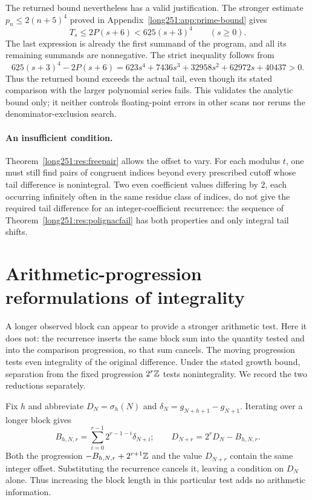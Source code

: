 \documentclass[11pt]{article}
\begin{document}
The returned bound nevertheless has a valid justification.  The stronger
estimate $p_n\le2(n+5)^4$ proved in
Appendix~\ref{long251:app:prime-bound} gives
\[
 T_s\le2P(s+6)<625(s+3)^4\qquad(s\ge0).
\]
The last expression is already the first summand of the program, and
all its remaining summands are nonnegative.  The strict inequality
follows from
\[
 625(s+3)^4-2P(s+6)
 =623s^4+7436s^3+32958s^2+62972s+40437>0.
\]
Thus the returned bound exceeds the actual tail, even though its stated
comparison with the larger polynomial series fails.  This validates the
analytic bound only; it neither controls floating-point errors in other
scans nor reruns the denominator-exclusion search.

\paragraph{An insufficient condition.}  Theorem~\ref{long251:res:freepair} allows the offset to vary.  For each
modulus $t$, one must still find pairs of congruent indices beyond every
prescribed cutoff whose tail difference is nonintegral.
Two even coefficient values differing by $2$, each occurring infinitely
often in the same residue class of indices, do not give the required
tail difference for an integer-coefficient recurrence: the sequence of
Theorem~\ref{long251:res:polignacfail} has both properties and only
integral tail shifts.

\section{Arithmetic-progression reformulations of integrality}
\label{long251:app:affine-detail}
A longer observed block can appear to provide a stronger arithmetic test.
Here it does not: the recurrence inserts the same block sum into the
quantity tested and into the comparison progression, so that sum cancels.
The moving progression tests even integrality of the original difference.
Under the stated growth bound, separation from the fixed progression
$2^r\mathbb{Z}$ tests nonintegrality.  We record the two reductions separately.

Fix $h$ and abbreviate $D_N=\sigma_h(N)$ and
$\delta_N=g_{N+h+1}-g_{N+1}$.  Iterating over a longer block gives
\[
 B_{h,N,r}=\sum_{i=0}^{r-1}2^{r-1-i}\delta_{N+i};
 \qquad D_{N+r}=2^rD_N-B_{h,N,r}.
\]
Both the progression $-B_{h,N,r}+2^{r+1}\mathbb{Z}$ and the value $D_{N+r}$
contain the same integer offset.  Substituting the recurrence cancels
it, leaving a condition on $D_N$ alone.  Thus increasing the block
length in this particular test adds no arithmetic information.
\end{document}
